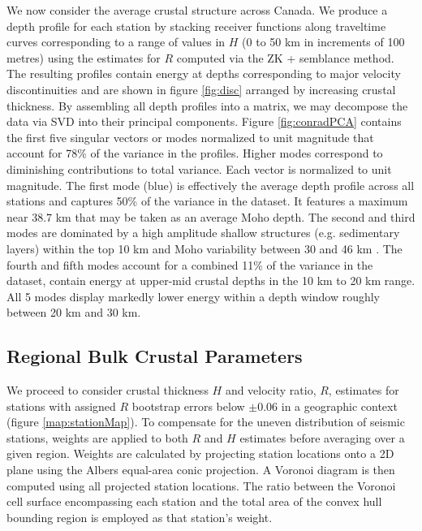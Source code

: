 \documentclass[draft, 12pt]{article}
\begin{document}
We now consider the average crustal structure across Canada. We produce a depth profile for each station by stacking receiver functions along traveltime curves corresponding to a range of values in $H$ (0 to 50 km in increments of 100 metres) using the estimates for $R$ computed via the ZK + semblance method. The resulting profiles contain energy at depths corresponding to major velocity discontinuities and are shown in figure \ref{fig:disc} arranged by increasing crustal thickness. By assembling all depth profiles into a matrix, we may decompose the data via SVD into their principal components. Figure \ref{fig:conradPCA} contains the first five singular vectors or modes normalized to unit magnitude that account for 78\% of the variance in the profiles. Higher modes correspond to diminishing contributions to total variance. Each vector is normalized to unit magnitude. The first mode (blue) is effectively the average depth profile across all stations and captures 50\% of the variance in the dataset. It features a maximum near 38.7 km that may be taken as an average Moho depth. The second and third modes are dominated by a high amplitude shallow structures (e.g. sedimentary layers) within the top 10 km and Moho variability between 30 and 46 km . The fourth and fifth modes account for a combined 11\% of the variance in the dataset, contain energy at upper-mid crustal depths in the 10 km to 20 km range. All 5 modes display markedly lower energy within a depth window roughly between 20 km and 30 km.






\subsection{Regional Bulk Crustal Parameters}

We proceed to consider crustal thickness $H$ and velocity ratio, $R$, estimates for stations with assigned $R$ bootstrap errors below $\pm 0.06$ in a geographic context (figure \ref{map:stationMap}). To compensate for the uneven distribution of seismic stations, weights are applied to both $R$ and $H$ estimates before averaging over a given region. Weights are calculated by projecting station locations onto a 2D plane using the Albers equal-area conic projection. A Voronoi diagram is then computed using all projected station locations. The ratio between the Voronoi cell surface encompassing each station and the total area of the convex hull bounding region is employed as that station's weight.
\end{document}
